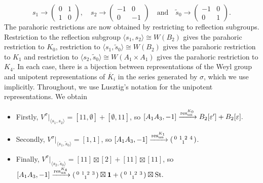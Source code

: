 \begin{example}
\begin{equation*}
        s_1\longrightarrow\begin{pmatrix}
            0 & 1 \\
            1 & 0
        \end{pmatrix},\quad s_2\longrightarrow\begin{pmatrix}
            -1 & 0 \\
            0 & -1
        \end{pmatrix}\quad\text{and}\quad \tilde{s}_0\longrightarrow\begin{pmatrix}
            -1 & 0 \\
            0 & 1
        \end{pmatrix}.
    \end{equation*}
    The parahoric restrictions are now obtained by restricting to reflection subgroups. Restriction to the reflection subgroup $\langle s_1,s_2\rangle\cong W(B_2)$ gives the parahoric restriction to $K_0$, restriction to $\langle s_1,\tilde{s}_0\rangle\cong W(B_2)$ gives the parahoric restriction to $K_1$ and restriction to $\langle s_2,\tilde{s}_0\rangle\cong W(A_1\times A_1)$ gives the parahoric restriction to $K_4$. In each case, there is a bijection between representations of the Weyl group and unipotent representations of $\overline{K}_i$ in the series generated by $\sigma$, which we use implicitly. Throughout, we use Lusztig's notation for the unipotent representations. We obtain
    \begin{itemize}
        \item Firstly, $V^\sigma|_{\langle s_1,s_2\rangle}=[11,\emptyset]+[\emptyset,11]$, so $[A_1A_3,-1]\xrightarrow{\mathrm{res}^{K_0}_{\mathrm{un}}}B_2[\varepsilon']+B_2[\varepsilon].$
        \item Secondly, $V^\sigma|_{\langle s_1,\tilde{s}_0\rangle}=[1,1]$, so $[A_1A_3,-1]\xrightarrow{\mathrm{res}^{K_1}_{\mathrm{un}}}\begin{psmallmatrix}
            0 \ 1\ 2\ 4\\
            \ \ \ 1 \ \ \
        \end{psmallmatrix}$.
        \item Finally, $V^\sigma|_{\langle s_2,\tilde{s}_0\rangle}=[11]\boxtimes[2]+[11]\boxtimes[11]$, so $[A_1A_3,-1]\xrightarrow{\mathrm{res}^{K_4}_{\mathrm{un}}}\begin{psmallmatrix}
            0 \ 1\ 2\ 3\\
            \ \ \ 1 \ \ \
        \end{psmallmatrix}\boxtimes\mathbf{1}+\begin{psmallmatrix}
            0 \ 1\ 2\ 3\\
            \ \ \ 1 \ \ \
        \end{psmallmatrix}\boxtimes\mathrm{St}.$
    \end{itemize}
\end{example}



